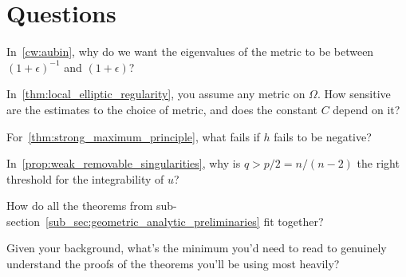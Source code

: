 \section{Questions}

\begin{question}
  In~\cref{cw:aubin}, why do we want the eigenvalues of the metric to be between $(1 + \epsilon)^{-1}$ and $(1 + \epsilon)$?
\end{question}

\begin{solution}
\end{solution}

\begin{question}
  In~\cref{thm:local_elliptic_regularity}, you assume any metric on $\Omega$. How sensitive are the estimates to the choice of metric, and does the constant $C$ depend on it?
\end{question}

\begin{solution}
\end{solution}

\begin{question}
  For~\cref{thm:strong_maximum_principle}, what fails if $h$ fails to be negative?
\end{question}

\begin{solution}
\end{solution}

\begin{question}
  In~\cref{prop:weak_removable_singularities}, why is $q > p/2 = n/(n-2)$ the right threshold for the integrability of $u$?
\end{question}

\begin{solution}
\end{solution}

\begin{question}
  How do all the theorems from sub-section~\ref{sub_sec:geometric_analytic_preliminaries} fit together?
\end{question}

\begin{solution}
\end{solution}

\begin{question}
  Given your background, what's the minimum you'd need to read to genuinely understand the proofs of the theorems you'll be using most heavily?
\end{question}

